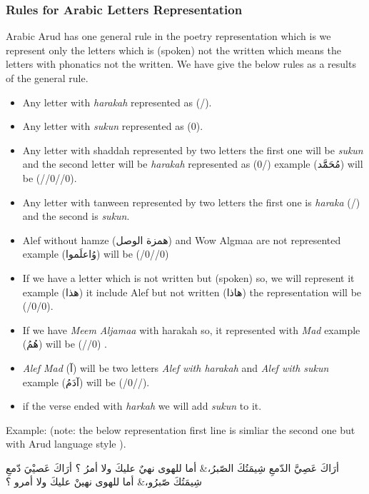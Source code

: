   \subsubsection{Rules for Arabic Letters Representation}
  Arabic Arud has one general rule in the poetry representation which is we represent only the letters which is (spoken) not the written which means the letters with phonatics not the written. We have give the below rules as a results of the general rule.

  \begin{itemize}
  \item Any letter with \textit{harakah} represented as (/).
  \item Any letter with \textit{sukun} represented as (0).
  \item Any letter with shaddah represented by two letters the first one will be \textit{sukun} and the second letter will be \textit{harakah} represented as (0/) example (\textarabic{مُحَمََّد}) will be (//0//0).
  \item Any letter with tanween represented by two letters the first one is \textit{haraka} (/) and the second is \textit{sukun}.
  \item Alef without hamze (\textarabic{همزة الوصل}) and Wow Algmaa are not represented example (\textarabic{وُاعلَموا}) will be (/0//0)
  \item If we have a letter which is not written but (spoken) so, we will represent it example (\textarabic{هذا}) it include Alef but not written (\textarabic{هاذا}) the representation will be (/0/0).
  \item If we have \textit{Meem Aljamaa} with harakah so, it represented with \textit{Mad} example (\textarabic{هُمُ}) will be (//0) .
  \item \textit{Alef Mad} (\textarabic{آ}) will be two letters \textit{Alef with harakah} and \textit{Alef with sukun} example (\textarabic{آدَمُ}) will be (/0//).
    \item if the verse ended with \textit{harkah} we will add \textit{sukun} to it.


    \end{itemize}
Example: (note: the below representation first line is simliar the second one but with Arud language style ).
\begin{Arabic}
  \begin{traditionalpoem*}
أرَاكَ عَصِيَّ الدّمعِ شِيمَتُكَ الصّبرُ،\quad & \quad أما للهوى نهيٌ عليكَ ولا أمرُ ؟
أرَاكَ عَصيْيَ دّمعِ شِيمَتُكَ صّبرُو،\quad & \quad أما للهوى نهينْ عليكَ ولا أمرو ؟
	\end{traditionalpoem*}
\end{Arabic}


